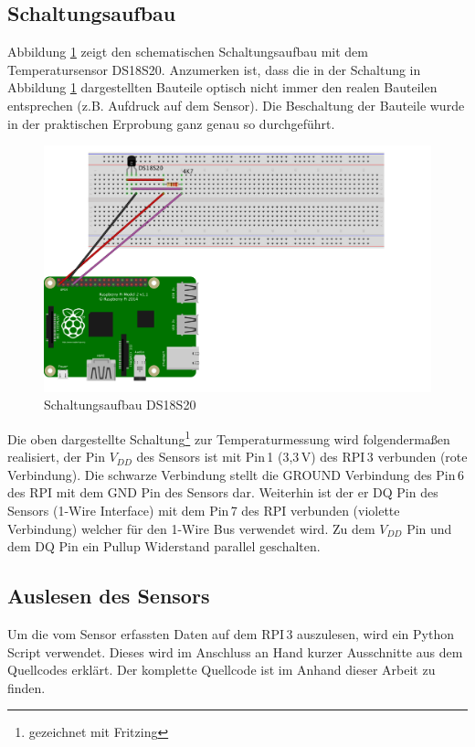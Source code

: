 \subsection{Schaltungsaufbau}
\label{subsection_Schaltungsaufbau_DS18S20}

Abbildung \ref{Abb_Schaltung_DS18S20} zeigt den schematischen Schaltungsaufbau mit dem Temperatursensor DS18S20. Anzumerken ist, dass die in der Schaltung in Abbildung \ref{Abb_Schaltung_DS18S20} dargestellten Bauteile optisch nicht immer den realen Bauteilen entsprechen (z.B. Aufdruck auf dem Sensor). Die Beschaltung der Bauteile wurde in der praktischen Erprobung ganz genau so durchgeführt. 

\begin{figure}[!h] 
  \centering
     \includegraphics[scale=.8]{BilderAllgemein/Schaltung_DS18S20.png}
  \caption{Schaltungsaufbau DS18S20}
  \label{Abb_Schaltung_DS18S20}
\end{figure}

Die oben dargestellte Schaltung\footnote{gezeichnet mit Fritzing} zur Temperaturmessung wird folgendermaßen realisiert, der Pin $V_{DD}$ des Sensors ist mit Pin\,1 (3,3\,V) des \ac{RPI}\,3 verbunden (rote Verbindung). Die schwarze Verbindung stellt die GROUND Verbindung des Pin\,6 des \ac{RPI} mit dem GND Pin des Sensors dar. Weiterhin ist der er DQ Pin des Sensors (1-Wire Interface) mit dem Pin\,7 des \ac{RPI} verbunden (violette Verbindung) welcher für den 1-Wire Bus verwendet wird. Zu dem  $V_{DD}$ Pin  und dem DQ Pin ein Pullup Widerstand parallel geschalten.

\subsection{Auslesen des Sensors}
\label{subsection_Auslesen_DS18S20}
Um die vom Sensor erfassten Daten auf dem \ac{RPI}\,3 auszulesen, wird ein Python Script verwendet. Dieses wird im Anschluss an Hand kurzer Ausschnitte aus dem Quellcodes erklärt. Der komplette Quellcode ist im Anhand dieser Arbeit zu finden.\\

